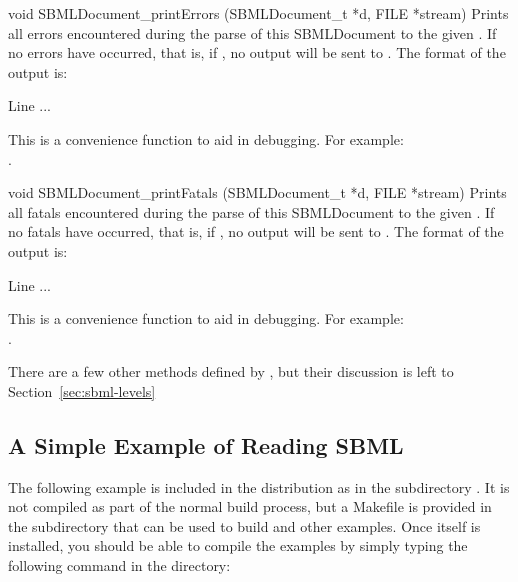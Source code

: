\documentclass{sbmlmanual}
\begin{document}
\begin{methoddef}{void SBMLDocument\_printErrors (SBMLDocument\_t *d,
FILE *stream)}
  Prints all errors encountered during the parse of this SBMLDocument
  to the given .  If no errors have occurred, that is, if 
  , no output will be sent
  to . The format of the output is:
  \begin{cVerbatim}
      Line %
      ...
  \end{cVerbatim}
  This is a convenience function to aid in debugging.  For example:\\
  .
 \end{methoddef}
  

\begin{methoddef}{void SBMLDocument\_printFatals (SBMLDocument\_t *d,
FILE *stream)}
  Prints all fatals encountered during the parse of this SBMLDocument
  to the given .  If no fatals have occurred, that is, if
  , no output will be sent
  to . The format of the output is:
  \begin{cVerbatim}
      Line %
      ...
  \end{cVerbatim}
  This is a convenience function to aid in debugging.  For example:\\
  .
 \end{methoddef}

There are a few other methods defined by , but
their discussion is left to Section~\ref{sec:sbml-levels}


\subsection{A Simple Example of Reading SBML}
\label{sec:read-example}

The following example is included in the \libsbml{} distribution as
 in the subdirectory .  It is not
compiled as part of the normal build process, but a Makefile is provided in
the  subdirectory that can be used to build
 and other examples.  Once \libsbml{} itself is
installed, you should be able to compile the examples by simply typing the
following command in the  directory:
\end{document}

